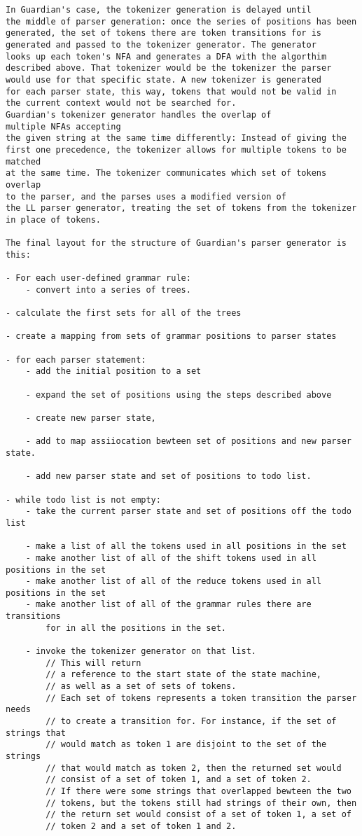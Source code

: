 {\begin{verbatim}
In Guardian's case, the tokenizer generation is delayed until
the middle of parser generation: once the series of positions has been
generated, the set of tokens there are token transitions for is
generated and passed to the tokenizer generator. The generator
looks up each token's NFA and generates a DFA with the algorthim
described above. That tokenizer would be the tokenizer the parser
would use for that specific state. A new tokenizer is generated
for each parser state, this way, tokens that would not be valid in
the current context would not be searched for.
Guardian's tokenizer generator handles the overlap of
multiple NFAs accepting
the given string at the same time differently: Instead of giving the
first one precedence, the tokenizer allows for multiple tokens to be matched
at the same time. The tokenizer communicates which set of tokens overlap
to the parser, and the parses uses a modified version of
the LL parser generator, treating the set of tokens from the tokenizer
in place of tokens.

The final layout for the structure of Guardian's parser generator is
this:

- For each user-defined grammar rule:
	- convert into a series of trees.

- calculate the first sets for all of the trees

- create a mapping from sets of grammar positions to parser states

- for each parser statement:
	- add the initial position to a set
	
	- expand the set of positions using the steps described above
	
	- create new parser state,
	
	- add to map assiiocation bewteen set of positions and new parser state.
	
	- add new parser state and set of positions to todo list.

- while todo list is not empty:
	- take the current parser state and set of positions off the todo list
	
	- make a list of all the tokens used in all positions in the set
	- make another list of all of the shift tokens used in all positions in the set
	- make another list of all of the reduce tokens used in all positions in the set
	- make another list of all of the grammar rules there are transitions
		for in all the positions in the set.
	
	- invoke the tokenizer generator on that list.
		// This will return
		// a reference to the start state of the state machine,
		// as well as a set of sets of tokens.
		// Each set of tokens represents a token transition the parser needs
		// to create a transition for. For instance, if the set of strings that
		// would match as token 1 are disjoint to the set of the strings
		// that would match as token 2, then the returned set would
		// consist of a set of token 1, and a set of token 2.
		// If there were some strings that overlapped bewteen the two
		// tokens, but the tokens still had strings of their own, then
		// the return set would consist of a set of token 1, a set of
		// token 2 and a set of token 1 and 2.
	

\end{verbatim}}
